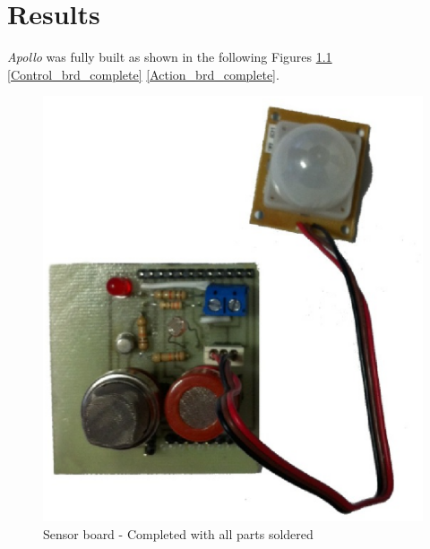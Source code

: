 \documentclass[12pt,a4paper]{report}
\begin{document}
\chapter{Results}
%
\emph{Apollo} was fully built as shown in the following Figures \ref{Sensor_brd_complete} \ref{Control_brd_complete} \ref{Action_brd_complete}.
\begin{figure}[H]
\centering
	\includegraphics*[scale=0.25]{sens_brd_complete}
	\caption{Sensor board - Completed with all parts soldered}
	\label{Sensor_brd_complete}
\end{figure}
\ \\
\end{document}

